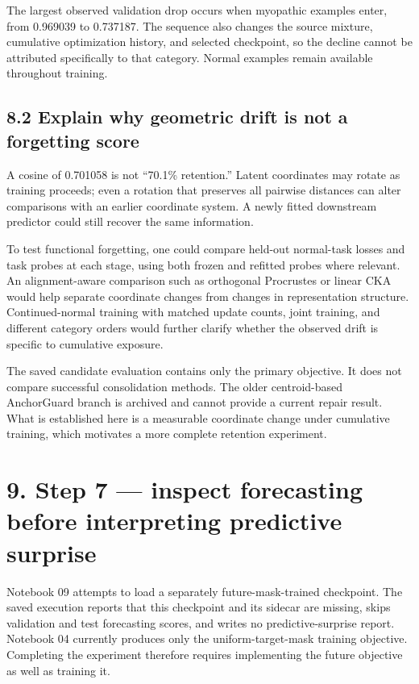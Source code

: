 \documentclass[11pt,letterpaper]{article}
\begin{document}
The largest observed validation drop occurs when myopathic examples
enter, from 0.969039 to 0.737187. The sequence also changes the source
mixture, cumulative optimization history, and selected checkpoint, so
the decline cannot be attributed specifically to that category. Normal
examples remain available throughout training.

\subsection{8.2 Explain why geometric drift is not a forgetting
score}\label{explain-why-geometric-drift-is-not-a-forgetting-score}

A cosine of 0.701058 is not ``70.1\% retention.'' Latent coordinates may
rotate as training proceeds; even a rotation that preserves all pairwise
distances can alter comparisons with an earlier coordinate system. A
newly fitted downstream predictor could still recover the same
information.

To test functional forgetting, one could compare held-out normal-task
losses and task probes at each stage, using both frozen and refitted
probes where relevant. An alignment-aware comparison such as orthogonal
Procrustes or linear CKA would help separate coordinate changes from
changes in representation structure. Continued-normal training with
matched update counts, joint training, and different category orders
would further clarify whether the observed drift is specific to
cumulative exposure.

The saved candidate evaluation contains only the primary objective. It
does not compare successful consolidation methods. The older
centroid-based AnchorGuard branch is archived and cannot provide a
current repair result. What is established here is a measurable
coordinate change under cumulative training, which motivates a more
complete retention experiment.

\section{9. Step 7 --- inspect forecasting before interpreting
predictive
surprise}\label{step-7-inspect-forecasting-before-interpreting-predictive-surprise}

Notebook 09 attempts to load a separately future-mask-trained
checkpoint. The saved execution reports that this checkpoint and its
sidecar are missing, skips validation and test forecasting scores, and
writes no predictive-surprise report. Notebook 04 currently produces
only the uniform-target-mask training objective. Completing the
experiment therefore requires implementing the future objective as well
as training it.
\end{document}

